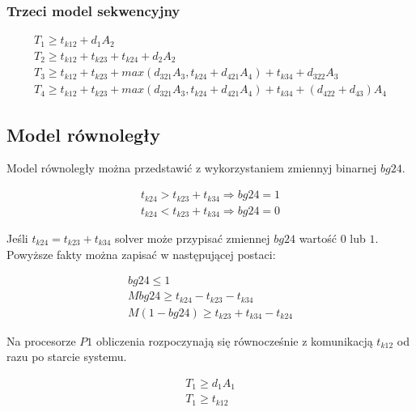 \subsubsection{Trzeci model sekwencyjny}

\begin{equation} \label{eq:sek3}
\begin{array}{l}
T_{1} \geq t_{k12} + d_{1}A_{2} \\
T_{2} \geq t_{k12} + t_{k23} + t_{k24} + d_{2}A_{2} \\
T_{3} \geq t_{k12} + t_{k23} + max(d_{321}A_{3}, t_{k24} + d_{421}A_{4}) + t_{k34} + d_{322}A_{3} \\
T_{4} \geq t_{k12} + t_{k23} + max(d_{321}A_{3}, t_{k24} + d_{421}A_{4}) + t_{k34} + (d_{422} + d_{43})A_{4}
\end{array}
\end{equation}

\subsection{Model równoległy}

Model równoległy można przedstawić z wykorzystaniem zmiennyj binarnej $bg24$.

\begin{equation} \label{eq:bg24}
\begin{array}{l}
t_{k24} > t_{k23} + t_{k34} \Rightarrow bg24 = 1 \\
t_{k24} < t_{k23} + t_{k34} \Rightarrow bg24 = 0
\end{array}
\end{equation}

Jeśli $t_{k24} = t_{k23} + t_{k34}$ solver może przypisać zmiennej $bg24$ wartość $0$ lub $1$.
Powyższe fakty można zapisać w następującej postaci:

\begin{equation}
\begin{array}{l}
bg24 \leq 1 \\
Mbg24 \geq t_{k24} - t_{k23} - t_{k34} \\
M(1 - bg24) \geq t_{k23} + t_{k34} - t_{k24}
\end{array}
\end{equation}

Na procesorze $P1$ obliczenia rozpoczynają się równocześnie z komunikacją $t_{k12}$ od razu po starcie systemu.

\begin{equation}
\begin{array}{l}
T_{1} \geq d_{1}A_{1} \\
T_{1} \geq t_{k12}
\end{array}
\end{equation}

